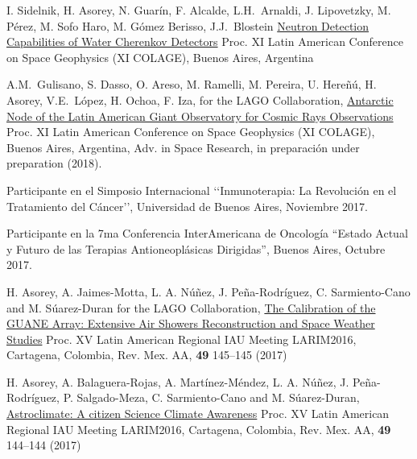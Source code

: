 \begin{etaremune}
\item {} I. Sidelnik, H. Asorey, N. Guarín, F. Alcalde, L.H.\ Arnaldi, J. Lipovetzky, M. Pérez, M. Sofo Haro, M. Gómez Berisso, J.J.\ Blostein \href{}{{Neutron Detection Capabilities of Water Cherenkov Detectors}} \en Proc.
XI Latin American Conference on Space Geophysics (XI COLAGE),  Buenos Aires, Argentina%

\item {} A.M.\ Gulisano, S. Dasso, O. Areso, M. Ramelli, M. Pereira, U. Hereñú, H. Asorey, V.E.\ López, H. Ochoa, F. Iza, for the LAGO Collaboration, \href{}{{Antarctic Node of the Latin American Giant Observatory for Cosmic Rays Observations}} \en Proc.
XI Latin American Conference on Space Geophysics (XI COLAGE),  Buenos Aires, Argentina, Adv.
in Space Research, \ifeng in preparación \else under preparation \fi (2018). %
	
\item {} Participante en el Simposio Internacional \lq\lq{}Inmunoterapia: La Revolución en el Tratamiento del Cáncer\rq\rq{}, Universidad de Buenos Aires, Noviembre 2017.

\item {} Participante en la 7ma Conferencia InterAmericana de Oncología ``Estado Actual y Futuro de las Terapias Antioneoplásicas Dirigidas'', Buenos Aires, Octubre 2017. 

\item {} H. Asorey, A. Jaimes-Motta, L. A. Núñez, J. Peña-Rodríguez, C. Sarmiento-Cano and M. Súarez-Duran for the LAGO Collaboration, \href{http://www.astroscu.unam.mx/rmaa/RMxAC..49/PDF/RMxAC..49\_poster3.pdf}{{The Calibration of the GUANE Array: Extensive Air Showers Reconstruction and Space Weather Studies}} \en Proc.
XV Latin American Regional IAU Meeting LARIM2016, Cartagena, Colombia, Rev.
Mex.
AA, {\textbf{49}} 145--145 (2017)

\item {} H. Asorey, A. Balaguera-Rojas, A. Martínez-Méndez, L. A. Núñez, J. Peña-Rodríguez, P. Salgado-Meza, C. Sarmiento-Cano and M. Súarez-Duran, \href{http://www.astroscu.unam.mx/rmaa/RMxAC..49/PDF/RMxAC..49\_poster2.pdf}{{Astroclimate: A citizen Science Climate Awareness}} \en Proc.
XV Latin American Regional IAU Meeting LARIM2016, Cartagena, Colombia, Rev.
Mex.
AA, {\textbf{49}} 144--144 (2017)


\end{etaremune}
